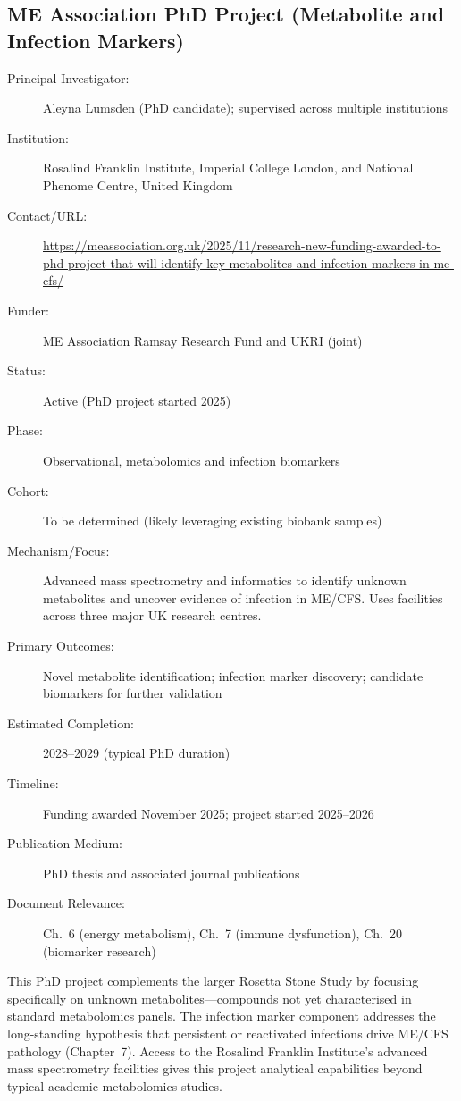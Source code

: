 \subsection{ME Association PhD Project (Metabolite and Infection Markers)}
\label{sec:registry-mea-phd}

\begin{description}
    \item[Principal Investigator:] Aleyna Lumsden (PhD candidate); supervised
        across multiple institutions
    \item[Institution:] Rosalind Franklin Institute, Imperial College London,
        and National Phenome Centre, United Kingdom
    \item[Contact/URL:] \url{https://meassociation.org.uk/2025/11/research-new-funding-awarded-to-phd-project-that-will-identify-key-metabolites-and-infection-markers-in-me-cfs/}
    \item[Funder:] ME Association Ramsay Research Fund and UKRI (joint)
    \item[Status:] Active (PhD project started 2025)
    \item[Phase:] Observational, metabolomics and infection biomarkers
    \item[Cohort:] To be determined (likely leveraging existing biobank samples)
    \item[Mechanism/Focus:] Advanced mass spectrometry and informatics to
        identify unknown metabolites and uncover evidence of infection in
        ME/CFS.  Uses facilities across three major UK research centres.
    \item[Primary Outcomes:] Novel metabolite identification; infection
        marker discovery; candidate biomarkers for further validation
    \item[Estimated Completion:] 2028--2029 (typical PhD duration)
    \item[Timeline:] Funding awarded November 2025; project started 2025--2026
    \item[Publication Medium:] PhD thesis and associated journal publications
    \item[Document Relevance:] Ch.~6 (energy metabolism), Ch.~7 (immune
        dysfunction), Ch.~20 (biomarker research)
\end{description}

This PhD project complements the larger Rosetta Stone Study by focusing
specifically on unknown metabolites---compounds not yet characterised in
standard metabolomics panels.  The infection marker component addresses the
long-standing hypothesis that persistent or reactivated infections drive
ME/CFS pathology (Chapter~7).  Access to the Rosalind Franklin Institute's
advanced mass spectrometry facilities gives this project analytical
capabilities beyond typical academic metabolomics studies.

